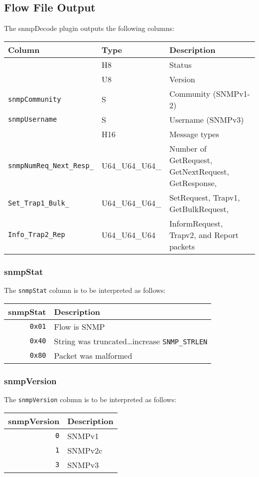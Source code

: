 \documentclass[documentation]{subfiles}
\begin{document}
\subsection{Flow File Output}
The snmpDecode plugin outputs the following columns:
\begin{longtable}{lll}
    \toprule
    {\bf Column} & {\bf Type} & {\bf Description}\\
    \midrule\endhead%
    {\tt \nameref{snmpStat}} & H8 & Status\\
    {\tt \nameref{snmpVersion}} & U8 & Version\\
    {\tt snmpCommunity} & S & Community (SNMPv1-2)\\
    {\tt snmpUsername} & S & Username (SNMPv3)\\
    {\tt \nameref{snmpMsgT}} & H16 & Message types\\
    {\tt snmpNumReq\_Next\_Resp\_} & U64\_U64\_U64\_ & Number of GetRequest, GetNextRequest, GetResponse,\\
    {\tt \qquad Set\_Trap1\_Bulk\_} & \qquad U64\_U64\_U64\_ & \qquad SetRequest, Trapv1, GetBulkRequest,\\
    {\tt \qquad Info\_Trap2\_Rep} & \qquad U64\_U64\_U64 & \qquad InformRequest, Trapv2, and Report packets\\
    \bottomrule
\end{longtable}

\subsubsection{snmpStat}\label{snmpStat}
The {\tt snmpStat} column is to be interpreted as follows:
\begin{longtable}{rl}
    \toprule
    {\bf snmpStat} & {\bf Description}\\
    \midrule\endhead%
    {\tt 0x01} & Flow is SNMP\\
    {\tt 0x40} & String was truncated\ldots increase {\tt SNMP\_STRLEN}\\
    {\tt 0x80} & Packet was malformed\\
    \bottomrule
\end{longtable}

\subsubsection{snmpVersion}\label{snmpVersion}
The {\tt snmpVersion} column is to be interpreted as follows:
\begin{longtable}{rl}
    \toprule
    {\bf snmpVersion} & {\bf Description}\\
    \midrule\endhead%
    {\tt 0} & SNMPv1\\
    {\tt 1} & SNMPv2c\\
    {\tt 3} & SNMPv3\\
    \bottomrule
\end{longtable}
\end{document}
